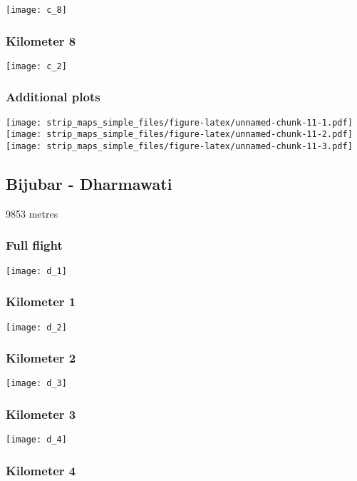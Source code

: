 \documentclass[]{article}
\begin{document}
\texttt{[image: c\_8]}

\subsubsection{Kilometer 8}\label{kilometer-8-2}

\texttt{[image: c\_2]}

\subsubsection{Additional plots}\label{additional-plots-2}

\texttt{[image: strip\_maps\_simple\_files/figure-latex/unnamed-chunk-11-1.pdf]}
\texttt{[image: strip\_maps\_simple\_files/figure-latex/unnamed-chunk-11-2.pdf]}
\texttt{[image: strip\_maps\_simple\_files/figure-latex/unnamed-chunk-11-3.pdf]}

\newpage

\subsection{Bijubar - Dharmawati}\label{bijubar---dharmawati}

9853 metres

\subsubsection{Full flight}\label{full-flight-3}

\texttt{[image: d\_1]}

\subsubsection{Kilometer 1}\label{kilometer-1-3}

\texttt{[image: d\_2]}

\subsubsection{Kilometer 2}\label{kilometer-2-3}

\texttt{[image: d\_3]}

\subsubsection{Kilometer 3}\label{kilometer-3-3}

\texttt{[image: d\_4]}

\subsubsection{Kilometer 4}\label{kilometer-4-3}
\end{document}
